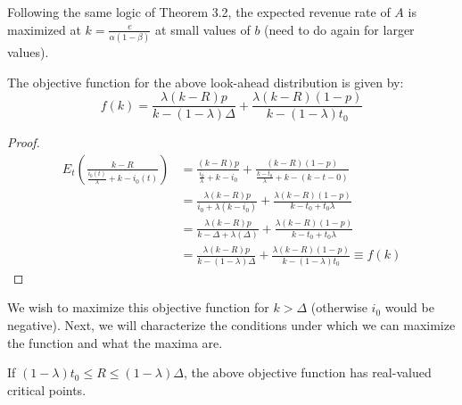 Following the same logic of Theorem 3.2, the expected revenue rate of $A$ is maximized at $k = \frac{e}{\alpha(1-\beta)}$ at small values of $b$ (need to do again for larger values).

\begin{lemma}
The objective function for the above look-ahead distribution is given by:
\begin{equation*}
f(k) = \frac{\lambda (k-R)p}{k-(1-\lambda)\Delta}+\frac{\lambda (k-R)(1-p)}{k-(1-\lambda)t_0}
\end{equation*}
\end{lemma}

\begin{proof}
\begin{align*}
E_t\left(\frac{k-R}{\frac{i_0(t)}{\lambda}+k-i_0(t)} \right) &= \frac{(k-R)p}{\frac{i_0}{\lambda}+k-i_0}+\frac{(k-R)(1-p)}{\frac{k-t_0}{\lambda}+k-(k-t-0)} \\
&= \frac{\lambda(k-R)p}{i_0+\lambda(k-i_0)}+\frac{\lambda(k-R)(1-p)}{k-t_0+t_0\lambda} \\
&= \frac{\lambda(k-R)p}{k-\Delta+\lambda(\Delta)}+\frac{\lambda(k-R)(1-p)}{k-t_0+t_0\lambda} \\
&= \frac{\lambda (k-R)p}{k-(1-\lambda)\Delta}+\frac{\lambda (k-R)(1-p)}{k-(1-\lambda)t_0} \equiv f(k)
\end{align*}
\end{proof}

We wish to maximize this objective function for $k>\Delta$ (otherwise $i_0$ would be negative). Next, we will characterize the conditions under which we can maximize the function and what the maxima are.

\begin{lemma}
If $(1-\lambda)t_0 \leq R \leq (1-\lambda)\Delta$, the above objective function has real-valued critical points.
\end{lemma}

